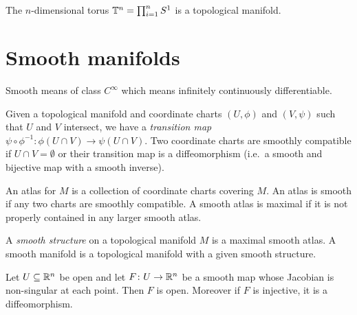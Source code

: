 \documentclass{skript}
\begin{document}
\begin{corr}
    The $n$-dimensional torus $\mathbb{T}^n = \prod_{i=1}^n S^1$ is a topological manifold.
\end{corr}

\section{Smooth manifolds}
\begin{note}
    Smooth means of class $C^\infty$ which means infinitely continuously differentiable.
\end{note}

\begin{definition}\label{def:transmap}
    Given a topological manifold and coordinate charts $(U,\phi)$ and $(V,\psi)$ such that $U$ and $V$ intersect, we have a \emph{transition map} $\psi\circ \phi^{-1}\colon \phi(U\cap V) \to \psi(U\cap V)$.
Two coordinate charts are smoothly compatible if $U\cap V = \emptyset$ or their transition map is a diffeomorphism (i.e.\ a smooth and bijective map with a smooth inverse). 

    An atlas for $M$ is a collection of coordinate charts covering $M$.
    An atlas is smooth if any two charts are smoothly compatible.
    A smooth atlas is maximal if it is not properly contained in any larger smooth atlas.
\end{definition}

\begin{definition}\label{def:smoothmanf}
    A \emph{smooth structure} on a topological manifold $M$ is a maximal smooth atlas.
    A smooth manifold is a topological manifold with a given smooth structure.
\end{definition}

\begin{lemma}\label{lem:opensmoothmaps}
    Let $U\subseteq \mathbb{R}^n$ be open and let $F\colon U\to\mathbb{R}^n$ be a smooth  map whose Jacobian is non-singular at each point. 
    Then $F$ is open.
    Moreover if $F$ is injective, it is a diffeomorphism.
\end{lemma}
\end{document}
